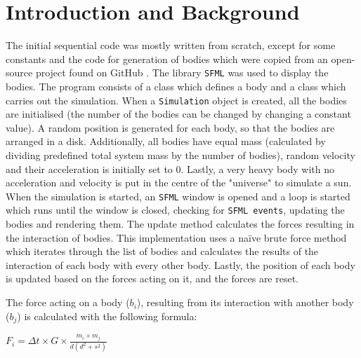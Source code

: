 \documentclass[12pt, a4paper]{article}
\title{\mytitle}
\author{\myauthor\hspace{1em}\\\contact\\\hspace{0.5em}\hspace{0.5em}\mymodule}
\date{}
\begin{document}
    \maketitle   
    \newpage

    \begin{abstract}    
    \noindent This report presents a comparison and analysis of different parallelisation methods of a brute force n-body simulation: CPU-based (Multithreading with OpenMP), Distributed (MPI), and GPU-based (CUDA).
    \end{abstract}

    \section{Introduction and Background}   
    The initial sequential code was mostly written from scratch, except for some constants and the code for generation of bodies which were copied from an open-source project found on GitHub \cite{PWhiddyN26:online}. The library \texttt{SFML} \cite{SFML74:online} was used to display the bodies. The program consists of a class which defines a body and a class which carries out the simulation. When a \texttt{Simulation} object is created, all the bodies are initialised (the number of the bodies can be changed by changing a constant value). A random position is generated for each body, so that the bodies are arranged in a disk. Additionally, all bodies have equal mass (calculated by dividing predefined total system mass by the number of bodies), random velocity and their acceleration is initially set to 0. Lastly, a very heavy body with no acceleration and velocity is put in the centre of the "universe" to simulate a sun. When the simulation is started, an \texttt{SFML} window is opened and a loop is started which runs until the window is closed, checking for \texttt{SFML events}, updating the bodies and rendering them. The update method calculates the forces resulting in the interaction of bodies. This implementation uses a naïve brute force method which iterates through the list of bodies and calculates the results of the interaction of each body with every other body. Lastly, the position of each body is updated based on the forces acting on it, and the forces are reset.  

    The force acting on a body ($b_i$), resulting from its interaction with another body ($b_j$) is calculated with the following formula: 
    
    $F_i = \Delta t \times G \times \frac{ m_i \times m_j}{d(d^2 + s^2)}$
    
\end{document}
